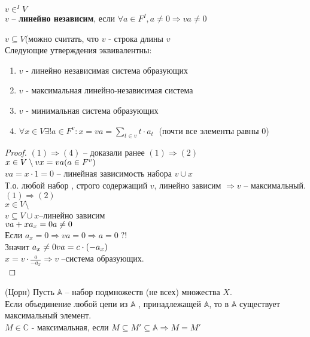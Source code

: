 \documentclass[12pt]{report}
\begin{document}
\begin{defn}
$v \in ^IV$\\
$v$ -- {\bf линейно независим}, если $\forall a \in F^I, a \neq 0 \Rightarrow v a  \neq  0$\\
\end{defn}

\begin{thm}
$v \subseteq V $(можно считать, что $v$ - строка длины $v$\\
Следующие утверждения эквивалентны:
\begin{enumerate}
    \item $v$ - линейно независимая система образующих
    \item $v$ - максимальная линейно-независимая система
    \item $v$ - минимальная система образующих
    \item $\forall x \in V \exists! a \in F^v : x = v a = \sum\limits_{t \in v} t \cdot a_t  \;$ (почти все элементы равны 0)
\end{enumerate}
\end{thm}
\begin{proof}
$(1) \Rightarrow (4) $ -- доказали ранее
$(1) \Rightarrow (2) $\\
$x \in V \setminus  v \\ x = v a (a \in F^v)$\\
$v a = x \cdot 1 = 0$ -- линейная зависимость набора $v \cup {x}$\\
Т.о. любой набор , строго содержащий $v$, линейно зависим $\Rightarrow v$ -- максимальный.
\\
$(1)\Rightarrow(2) $\\
$x \in V \setminus $\\
$v \subseteq V \cup {x} $--линейно зависим\\
$va + x a_x = 0 \\ a \ne 0$\\
Если $a_x = 0 \Rightarrow va = 0 \Rightarrow a = 0 \; ?!$\\
Значит $a_x \ne 0 \\ va = c\cdot (-a_x)$\\
$x = v \cdot \frac{a}{-a_x} \Rightarrow v$ --система образующих.\\
\end{proof}

\begin{lm}(Цорн)
Пусть $\mathbb A $ -- набор подмножеств (не всех) множества $X$. \\
Если объединение любой цепи из $\mathbb A$ , принадлежащей $\mathbb A$, то в $\mathbb A$ существует максимальный элемент.\\
$M \in \mathbb C$ - максимальная, если $M \subseteq M' \subseteq \mathbb A \Rightarrow M =M'$\\
\end{lm}
\end{document}
